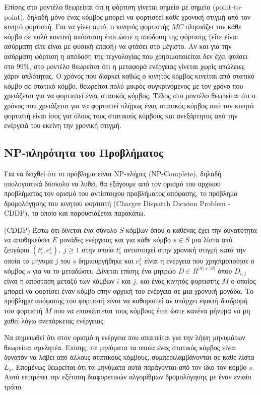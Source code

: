 Επίσης στο μοντέλο θεωρείται ότι η φόρτιση γίνεται σημείο με σημείο (point-to-point), δηλαδή μόνο ένας κόμβος μπορεί να φορτιστεί κάθε χρονική στιγμή από τον κινητό
φορτιστή. Για να γίνει αυτό, ο κινητός φορτιστής $MC$ πλησιάζει τον κάθε κόμβο σε πολύ κοντινή απόσταση έτσι ώστε η απόδοση της φόρτισης (είτε είναι ασύρματη είτε
είναι με φυσική επαφή) να φτάσει στο μέγιστο. Αν και για την ασύρματη φόρτιση η απόδοση της τεχνολογίας που χρησιμοποιείται δεν έχει φτάσει στο 99\%, στο μοντέλο
θεωρείται ότι η μεταφορά ενέργειας γίνεται χωρίς απώλειες χάριν απλότητας. Ο χρόνος που διαρκεί καθώς ο κινητός κόμβος κινείται από στατικό κόμβο σε στατικό κόμβο,
θεωρείται πολύ μικρός συγκρινόμενος με τον χρόνο που χρειάζεται για να φορτιστεί ένας στατικός κόμβος. Τέλος στο μοντέλο θεωρείται ότι ο χρόνος που χρειάζεται για να
φορτιστεί πλήρως ένας στατικός κόμβος από τον κινητό φορτιστή είναι ίσος για όλους τους στατικούς κόμβους και ανεξάρτητος από την ενέργειά του εκείνη την χρονική
στιγμή.


\subsection{NP-πληρότητα του Προβλήματος}
Για να δειχθεί ότι το πρόβλημα είναι NP-πλήρες (NP-Complete), δηλαδή υπολογιστικά δύσκολο να λυθεί, θα εξάγουμε από τον ορισμό του αρχικού προβλήματος τον ορισμό του
αντίστοιχου προβλήματος απόφασης, το πρόβλημα δρομολόγησης του κινητού φορτιστή  (Charger Dispatch Dicision Problem - CDDP), το οποίο και παρουσιάζεται παρακάτω.

\begin{definition}
(CDDP) Έστω ότι δίνεται ένα σύνολο $S$ κόμβων όπου ο καθένας έχει την δυνατότητα να αποθηκεύσει $E$ μονάδες ενέργειας και για κάθε κόμβο $s\in S$ μια λίστα από
ζευγάρια $(t_{s}^{j}, e_{s}^{j}),\; j\geq 1$ στην οποία $t_{s}^{j}$ αντιστοιχεί στην χρονική στιγμή κατά την οποία το μήνυμα $j$ του $s$ δημιουργήθηκε και $e^{j}_{s}$
είναι η ενέργεια που χρησιμοποίησε ο κόμβος $s$ για να το μεταδώσει. Δίνεται επίσης ένα μητρώο $D\in R^{|S|\times |S|}$ όπου $D_{i,j}$ είναι η απόσταση μεταξύ των
κόμβων $i$ και $j$, και ένας κινητός φορτιστής $M$ ο οποίος μπορεί να φορτίσει έναν κόμβο στην αρχική του ενέργεια σε μια χρονική μονάδα. Το πρόβλημα απόφασης του
φορτιστή είναι να  καθοριστεί αν υπάρχει εφικτή διαδρομή του φορτιστή $M$ που να επισκέπτεται τους κόμβους έτσι ώστε κανένα μήνυμα να μη χαθεί λόγω ανεπάρκειας
ενέργειας.
\end{definition}
Να σημειωθεί ότι στον ορισμό η ενέργεια που απαιτείται για την λήψη μηνυμάτων θεωρείται αμελητέα. Επίσης, τα μηνύματα τα οποία ένας στατικός κόμβος είναι δυνατόν να
λάβει από άλλους στατικούς κόμβους, συμπεριλαμβάνονται σε κάθε λίστα $L_{s}$. Επομένως θεωρείται ότι τα μηνύματα αυτά παράγονται από τον ίδιο τον κόμβο $s$. Αυτό
επιτρέπει την εξέταση διαφορετικών αλγορίθμων δρομολόγησης με έναν ενιαίο τρόπο.

